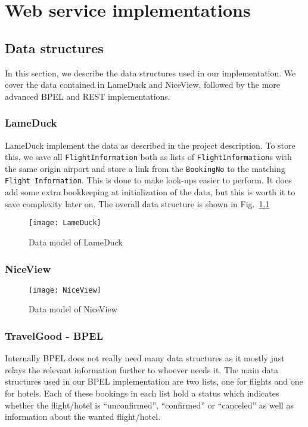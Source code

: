 {\setlength{\chapterfontsize}{23pt}
\chapter{Web service implementations}
}

\section{Data structures}
In this section, we describe the data structures used in our implementation. We cover the data contained in LameDuck and NiceView, followed by the more advanced BPEL and REST implementations.

\subsection{LameDuck}
LameDuck implement the data as described in the project description. To store this, we save all \texttt{FlightInformation} both as lists of \texttt{FlightInformation}s with the same origin airport and store a link from the \texttt{BookingNo} to the matching \texttt{Flight Information}. This is done to make look-ups easier to perform. It does add some extra bookkeeping at initialization of the data, but this is worth it to save complexity later on. The overall data structure is shown in Fig.~\ref{fig:lameduck_class}

\begin{figure}[H]
\centering
\texttt{[image: LameDuck]}
\caption{Data model of LameDuck}
\label{fig:lameduck_class}
\end{figure}


\subsection{NiceView}
\begin{figure}[H]
\centering
\texttt{[image: NiceView]}
\caption{Data model of NiceView}
\label{fig:niceview_class}
\end{figure}

\subsection{TravelGood - BPEL}
Internally BPEL does not really need many data structures as it mostly just relays the relevant information further to whoever needs it. The main data structures used in our BPEL implementation are two lists, one for flights and one for hotels. Each of these bookings in each list hold a status which indicates whether the flight/hotel is ``unconfirmed'', ``confirmed'' or ``canceled'' as well as information about the wanted flight/hotel.

